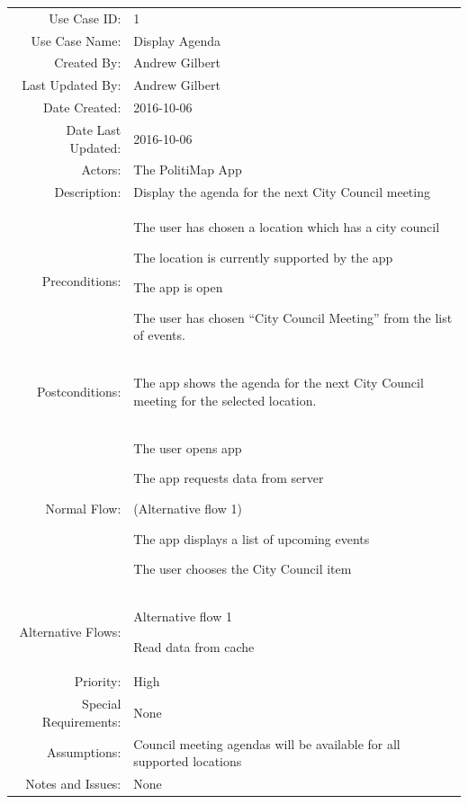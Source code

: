 \documentclass[12pt,oneside,letterpaper]{article}
\newenvironment{packed_enumerate}{
\begin{minipage}[t]{\linewidth}\begin{compactenum}[after=\strut]}
{\end{compactenum}\end{minipage}}
\begin{document}
\begin{longtabu}{|r|p{3.8in}|}
\hline
  Use Case ID: & 1\\
  Use Case Name: & Display Agenda\\
  Created By: & Andrew Gilbert\\
  Last Updated By: & Andrew Gilbert\\
  Date Created: & 2016-10-06\\
  Date Last Updated: & 2016-10-06\\
  Actors: & The PolitiMap App\\
  Description: & Display the agenda for the next City Council meeting\\
  Preconditions: &
  \begin{packed_enumerate}
  \item The user has chosen a location which has a city council
  \item The location is currently supported by the app
  \item The app is open
  \item The user has chosen ``City Council Meeting'' from the list of events.
  \end{packed_enumerate} \\
  Postconditions: &
  \begin{packed_enumerate}
  \item The app shows the agenda for the next City Council meeting for
    the selected location.
  \end{packed_enumerate} \\
  Normal Flow: &
  \begin{packed_enumerate}
  \item The user opens app
  \item The app requests data from server
  \item (Alternative flow 1)
  \item The app displays a list of upcoming events
  \item The user chooses the City Council item
  \end{packed_enumerate} \\
  Alternative Flows: &
  Alternative flow 1
  
  \begin{packed_enumerate}
  \item Read data from cache
  \end{packed_enumerate} \\
  Priority: & High\\
  Special Requirements: & None\\
  Assumptions: & Council meeting agendas will be available for all
  supported locations\\
  Notes and Issues: & None\\
  \hline
\end{longtabu}
\end{document}
